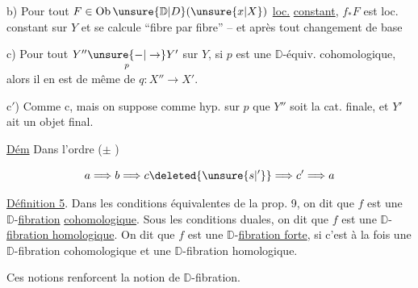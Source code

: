 b) Pour tout $F\in\operatorname{Ob}\unsure{\mathbb D|D}(\unsure{x|X})$ \uline{loc.} \uline{constant}, $f_*F$ est loc. constant sur $Y$ et se calcule ``fibre par fibre'' -- et  après tout changement de base

c) Pour tout $Y''\underset{p}{\unsure{\mathord{-}|\to}}Y'$ sur $Y$, si $p$ est une $\mathbb D$-équiv. cohomologique, alors il en est de même de $q:X''\to X'$.

c$'$) Comme c, mais on suppose  comme hyp. sur $p$ que $Y''$ soit la cat. finale, et $Y'$ ait un objet final.

\uline{Dém} Dans l'ordre ($\pm$ )

\[a\Longrightarrow b\Longrightarrow c\deleted{\unsure{s|'}}\Longrightarrow c'\Longrightarrow a\]

\uline{Définition 5}. Dans les conditions équivalentes de la prop. 9, on dit que $f$ est une $\mathbb D$-\uline{fibration} \uline{cohomologique}. Sous les conditions duales, on dit que $f$ est une $\mathbb D$-\uline{fibration homologique}. On dit que $f$ est une $\mathbb D$-\uline{fibration forte}, si c'est à la fois une $\mathbb D$-fibration cohomologique et une $\mathbb D$-fibration homologique.

Ces notions  renforcent la notion de $\mathbb D$-fibration. 





